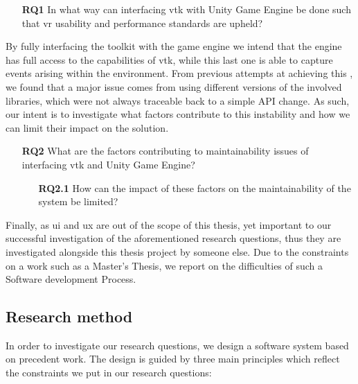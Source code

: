 \begin{itemize}[leftmargin=1.5truecm]
    \item[\textbf{RQ1}] In what way can interfacing \acrlong{vtk} with Unity Game Engine be done such that \acrshort{vr} usability and performance standards are upheld?
\end{itemize}

By fully interfacing the toolkit with the game engine we intend that the engine has full access to the capabilities of \acrshort{vtk}, while this last one is able to capture events arising within the environment. From previous attempts at achieving this \cite{dreuning_visual_2016, kruis_creating_2017, schutte_virtual_2018, wheeler_virtual_2018}, we found that a major issue comes from using different versions of the involved libraries, which were not always traceable back to a simple API change. As such, our intent is to investigate what factors contribute to this instability and how we can limit their impact on the solution.

\begin{itemize}[leftmargin=1.5truecm]
    \item[\textbf{RQ2}] What are the factors contributing to maintainability issues of interfacing \acrlong{vtk} and Unity Game Engine?
    \begin{itemize}[leftmargin=1.5truecm]
        \item[\textbf{RQ2.1}] How can the impact of these factors on the maintainability of the system be limited?
    \end{itemize}
\end{itemize}

Finally, as \acrshort{ui} and \acrshort{ux} are out of the scope of this thesis, yet important to our successful investigation of the aforementioned research questions, thus they are investigated alongside this thesis project by someone else. Due to the constraints on a work such as a Master's Thesis, we report on the difficulties of such a Software development Process.

\subsection{Research method}

In order to investigate our research questions, we design a software system based on precedent work. The design is guided by three main principles which reflect the constraints we put in our research questions:

